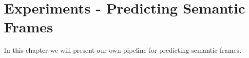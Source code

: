 \chapter{Experiments - Predicting Semantic Frames}
\label{chap:experiments}


In this chapter we will present our own pipeline for predicting semantic frames. 
